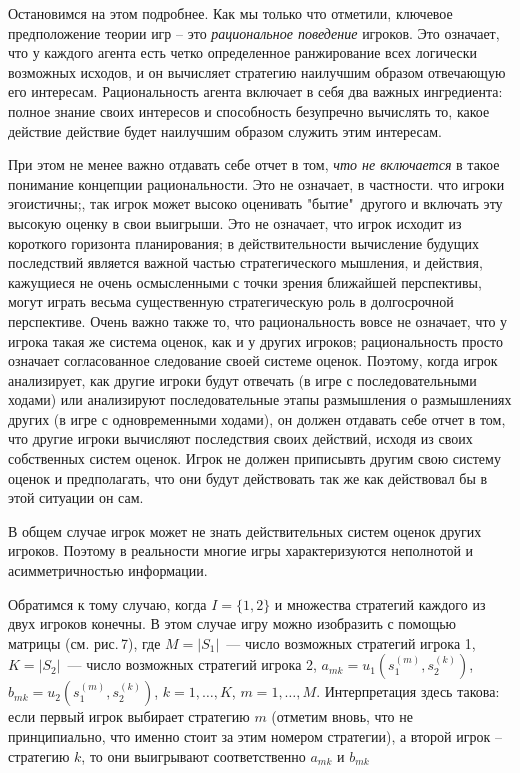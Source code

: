 \documentclass[12pt]{article}
\begin{document}
Остановимся на этом подробнее. Как мы только что отметили, ключевое
предположение теории игр -- это \emph{рациональное поведение}
игроков. Это означает, что у каждого агента есть четко определенное
ранжирование всех логически возможных исходов, и он вычисляет
стратегию наилучшим образом отвечающую его интересам. Рациональность
агента включает в себя два важных ингредиента: полное знание своих
интересов и способность безупречно вычислять то, какое действие
действие будет наилучшим образом служить этим интересам.

При этом не менее важно отдавать себе отчет в том, \emph{что не
включается} в такое понимание концепции рациональности. Это не
означает, в частности. что игроки эгоистичны;, так игрок может
высоко оценивать "бытие"\, другого и включать эту высокую оценку в
свои выигрыши. Это не означает, что игрок исходит из короткого
горизонта планирования; в действительности вычисление будущих
последствий является важной частью стратегического мышления, и
действия, кажущиеся не очень осмысленными с точки зрения ближайшей
перспективы, могут играть весьма существенную стратегическую роль в
долгосрочной перспективе. Очень важно также то, что рациональность
вовсе не означает, что у игрока такая же система оценок, как и у
других игроков; рациональность просто означает согласованное
следование своей системе оценок. Поэтому, когда игрок анализирует,
как другие игроки будут отвечать (в игре с последовательными ходами)
или анализируют последовательные этапы размышления о размышлениях
других (в игре с одновременными ходами), он должен отдавать себе
отчет в том, что другие игроки вычисляют последствия своих действий,
исходя из своих собственных систем оценок. Игрок не должен
приписывть другим свою систему оценок и предполагать, что они будут
действовать так же как действовал бы в этой ситуации он сам.

В общем случае игрок может не знать действительных систем оценок
других игроков. Поэтому в реальности многие игры характеризуются
неполнотой и асимметричностью информации.

Обратимся к тому случаю, когда $I=\{1,2\}$ и множества стратегий
каждого из двух игроков конечны.  В этом случае игру можно
изобразить с помощью матрицы (см. рис.\,7), где $M=|S_1|$~---
число возможных стратегий игрока 1, $K=|S_2|$~--- число возможных
стратегий игрока 2, $a_{mk}=u_1(s^{(m)}_1,s^{(k)}_2)$,
$b_{mk}=u_2(s^{(m)}_1,s^{(k)}_2)$, $k=1,\ldots,K$, $m=1,\ldots,M$.
Интерпретация здесь такова: если первый игрок выбирает стратегию
$m$ (отметим вновь, что не принципиально, что именно стоит за
этим номером стратегии), а второй игрок -- стратегию $k$, то они
выигрывают соответственно $a_{mk}$ и $b_{mk}$
\end{document}
